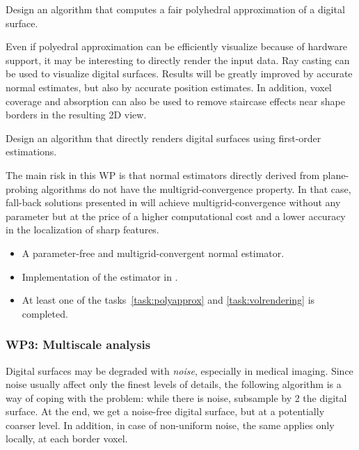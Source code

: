 \begin{Task}
  \label{task:polyapprox}
  Design an algorithm that computes a fair polyhedral approximation of a digital surface. 
\end{Task}

Even if polyedral approximation can be efficiently visualize because of hardware support,
it may be interesting to directly render the input data. Ray casting can be used to
visualize digital surfaces. Results will be greatly improved by accurate normal estimates,
but also by accurate position estimates. In addition, voxel coverage and absorption can
also be used to remove staircase effects near shape borders in the resulting 2D view.

\begin{Task}
  \label{task:volrendering}
  Design an algorithm that directly renders digital surfaces using first-order estimations.  
\end{Task}

\Risks
The main risk in this WP is that normal estimators
directly derived from plane-probing algorithms do not have the multigrid-convergence
property. In that case, fall-back solutions presented in  will achieve
multigrid-convergence without any parameter but at the price of a higher computational
cost and a lower accuracy in the localization of sharp features. 

\Success
\begin{itemize}
  \item A parameter-free and multigrid-convergent normal estimator.
  \item Implementation of the estimator in \DGtal.
  \item At least one of the tasks~\ref{task:polyapprox} and \ref{task:volrendering} is completed. 
\end{itemize}

  
\subsubsection{WP3: Multiscale analysis}
\label{wpScale}


Digital surfaces may be degraded with \emph{noise}, especially in medical imaging.
Since noise usually affect only the finest levels of details, the following algorithm
is a way of coping with the problem: while there is noise, subsample by 2 the digital surface.
At the end, we get a noise-free digital surface, but at a potentially coarser level.
In addition, in case of non-uniform noise, the same applies only locally, \ie at each border voxel.  

